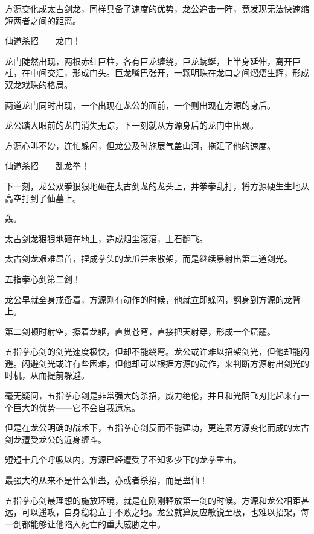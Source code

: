 
\begin{this_body}



方源变化成太古剑龙，同样具备了速度的优势，龙公追击一阵，竟发现无法快速缩短两者之间的距离。

仙道杀招——龙门！

龙门陡然出现，两根赤红巨柱，各有巨龙缠绕，巨龙蜿蜒，上半身延伸，离开巨柱，在中间交汇，形成门头。巨龙嘴巴张开，一颗明珠在龙口之间熠熠生辉，形成双龙戏珠的格局。

两道龙门同时出现，一个出现在龙公的面前，一个则出现在方源的身后。

龙公踏入眼前的龙门消失无踪，下一刻就从方源身后的龙门中出现。

方源心叫不妙，连忙躲闪，但龙公及时施展气盖山河，拖延了他的速度。

仙道杀招——乱龙拳！

下一刻，龙公双拳狠狠地砸在太古剑龙的龙头上，并拳拳乱打，将方源硬生生地从高空打到了仙墓上。

轰。

太古剑龙狠狠地砸在地上，造成烟尘滚滚，土石翻飞。

太古剑龙艰难昂首，捏成拳头的龙爪并未散架，而是继续暴射出第二道剑光。

五指拳心剑第二剑！

龙公早就全身戒备着，方源刚有动作的时候，他就立即躲闪，翻身到方源的龙背上。

第二剑顿时射空，擦着龙躯，直贯苍穹，直接把天射穿，形成一个窟窿。

五指拳心剑的剑光速度极快，但却不能绕弯。龙公或许难以招架剑光，但他却能闪避。闪避剑光或许有些困难，但他却可以根据方源的动作，来判断方源射出剑光的时机，从而提前躲避。

毫无疑问，五指拳心剑是非常强大的杀招，威力绝伦，并且和光阴飞刃比起来有一个巨大的优势——它不会自我遗忘。

但是在龙公明确的战术下，五指拳心剑反而不能建功，更连累方源变化而成的太古剑龙遭受龙公的近身缠斗。

短短十几个呼吸以内，方源已经遭受了不知多少下的龙拳重击。

最强大的从来不是什么仙蛊，亦或者杀招，而是蛊仙！

五指拳心剑最理想的施放环境，就是在刚刚释放第一剑的时候。方源和龙公相距甚远，可以遥攻，自身稳稳立于不败之地。龙公就算反应敏锐至极，也难以招架，每一剑都能够让他陷入死亡的重大威胁之中。


\end{this_body}

